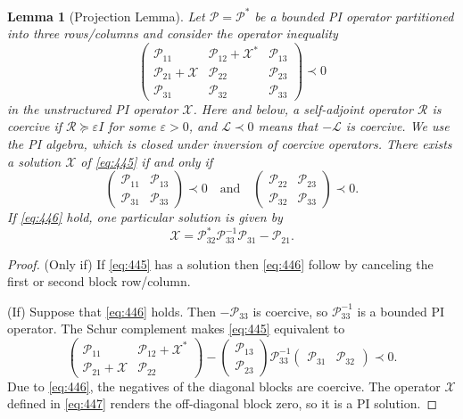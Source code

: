 \documentclass[10pt,a4paper]{article}
\newcommand{\op}[1]{\mathcal{#1}}
\newtheorem{lemma}{Lemma}
\begin{document}
\begin{lemma}[Projection Lemma]
Let $\op P=\op P^*$ be a bounded PI operator partitioned into three
rows/columns and consider the operator inequality
\begin{equation}\tag{4.4.5}\label{eq:445}
 \begin{pmatrix}
 \op P_{11}&\op P_{12}+\op X^*&\op P_{13}\\
 \op P_{21}+\op X&\op P_{22}&\op P_{23}\\
 \op P_{31}&\op P_{32}&\op P_{33}
 \end{pmatrix}\prec0
\end{equation}
in the unstructured PI operator $\op X$. Here and below, a self-adjoint
operator $\op R$ is \emph{coercive} if $\op R\succeq\varepsilon I$
for some $\varepsilon>0$, and $\op L\prec0$ means that $-\op L$
is coercive. We use the PI algebra, which is closed under inversion
of coercive operators.
There exists a solution $\op X$ of \eqref{eq:445} if and only if
\begin{equation}\tag{4.4.6}\label{eq:446}
 \begin{pmatrix}\op P_{11}&\op P_{13}\\
                 \op P_{31}&\op P_{33}\end{pmatrix}\prec0
 \quad\text{and}\quad
 \begin{pmatrix}\op P_{22}&\op P_{23}\\
                 \op P_{32}&\op P_{33}\end{pmatrix}\prec0.
\end{equation}
If \eqref{eq:446} hold, one particular solution is given by
\begin{equation}\tag{4.4.7}\label{eq:447}
 \op X=\op P_{32}^*\op P_{33}^{-1}\op P_{31}-\op P_{21}.
\end{equation}
\end{lemma}

\begin{proof}
(Only if) If \eqref{eq:445} has a solution then \eqref{eq:446} follow
by canceling the first or second block row/column.

(If) Suppose that \eqref{eq:446} holds. Then $-\op P_{33}$ is coercive,
so $\op P_{33}^{-1}$ is a bounded PI operator. The Schur
complement makes \eqref{eq:445} equivalent to
\[
 \begin{pmatrix}\op P_{11}&\op P_{12}+\op X^*\\
                 \op P_{21}+\op X&\op P_{22}\end{pmatrix}
 -
 \begin{pmatrix}\op P_{13}\\\op P_{23}\end{pmatrix}
 \op P_{33}^{-1}
 \begin{pmatrix}\op P_{31}&\op P_{32}\end{pmatrix}\prec0.
\]
Due to \eqref{eq:446}, the negatives of the diagonal blocks are coercive.
The operator $\op X$ defined in \eqref{eq:447} renders the
off-diagonal block zero, so it is a PI solution.
\end{proof}
\end{document}
